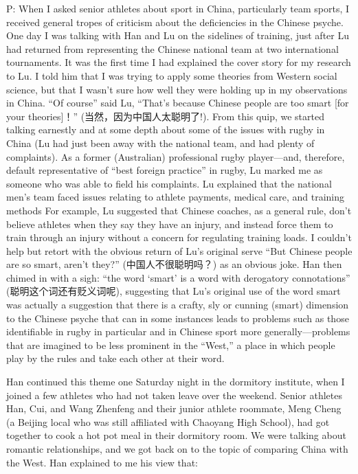 \begin{CJK}{UTF8}{gbsn}
P:
When I asked senior athletes about sport in China, particularly team sports, I received general tropes of criticism about the deficiencies in the Chinese psyche.  One day I was talking with Han and Lu on the sidelines of training, just after Lu had returned from representing the Chinese national team at two international tournaments.  It was the first time I had explained the cover story for my research to Lu.  I told him that I was trying to apply some theories from Western social science, but that I wasn't sure how well they were holding up in my observations in China.  ``Of course'' said Lu, ``That's because Chinese people are too smart [for your theories]！''  (当然，因为中国人太聪明了!).  From this quip, we started talking earnestly and at some depth about some of the issues with rugby in China (Lu had just been away with the national team, and had plenty of complaints).
As a former (Australian) professional rugby player—and,  therefore, default representative of ``best foreign practice'' in rugby, Lu marked me as someone who was able to field his complaints. Lu explained that the national men's team faced issues relating to athlete payments, medical care, and training methods
For example, Lu suggested that Chinese coaches, as a general rule, don't believe athletes when they say they have an injury, and instead force them to train through an injury without a concern for regulating training loads.  I couldn't help but retort with the obvious return of Lu's original serve ``But Chinese people are so smart, aren't they?'' (中国人不很聪明吗？) as an obvious joke.  Han then chimed in with a sigh: ``the word `smart' is a word with derogatory connotations'' (聪明这个词还有贬义词呢), suggesting that Lu's original use of the word smart was actually a suggestion that there is a crafty, sly or cunning (smart) dimension to the Chinese psyche that can in some instances leads to problems such as those identifiable in rugby in particular and in Chinese sport more generally---problems that are imagined to be less prominent in the ``West,'' a place in which people play by the rules and take each other at their word.

Han continued this theme one Saturday night in the dormitory institute, when I joined a few athletes who had not taken leave over the weekend.  Senior athletes Han, Cui, and Wang Zhenfeng and their junior athlete roommate, Meng Cheng (a Beijing local who was still affiliated with Chaoyang High School), had got together to cook a hot pot meal in their dormitory room.  We were talking about romantic relationships, and we got back on to the topic of comparing China with the West.  Han explained to me his view that:


\end{CJK}
